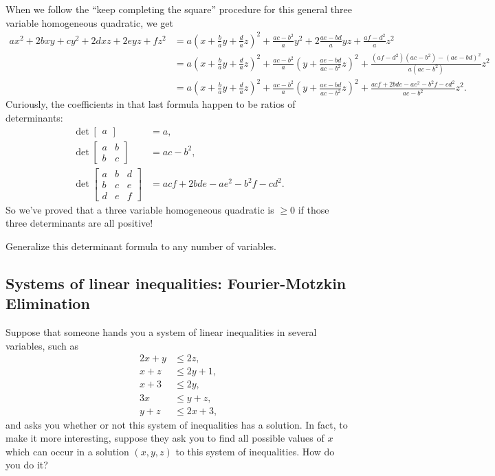 When we follow the ``keep completing the square'' procedure for this general three variable homogeneous quadratic, we get
\begin{align*}
ax^2 + 2bxy + cy^2 + 2dxz + 2eyz + fz^2 &= a(x + \tfrac{b}{a}y + \tfrac{d}{a}z)^2 + \tfrac{ac-b^2}{a}y^2 + 2\tfrac{ae-bd}{a}yz + \tfrac{af-d^2}{a}z^2\\
&= a(x + \tfrac{b}{a}y + \tfrac{d}{a}z)^2 + \tfrac{ac-b^2}{a}(y + \tfrac{ae-bd}{ac-b^2}z)^2 + \tfrac{(af-d^2)(ac-b^2)-(ae-bd)^2}{a(ac-b^2)}z^2\\
&= a(x + \tfrac{b}{a}y + \tfrac{d}{a}z)^2 + \tfrac{ac-b^2}{a}(y + \tfrac{ae-bd}{ac-b^2}z)^2 + \tfrac{acf + 2bde - ae^2 - b^2f - cd^2}{ac-b^2}z^2.
\end{align*}
Curiously, the coefficients in that last formula happen to be ratios of determinants:
\begin{align*}
\det \begin{bmatrix} a\end{bmatrix} &= a,\\
\det \begin{bmatrix} a & b\\ b & c\end{bmatrix} &= ac - b^2,\\
\det \begin{bmatrix} a & b & d\\ b & c & e\\ d & e & f \end{bmatrix} &= acf + 2bde - ae^2 - b^2f - cd^2.
\end{align*}
So we've proved that a three variable homogeneous quadratic is $\ge 0$ if those three determinants are all positive!

\bigskip

\begin{exer} Generalize this determinant formula to any number of variables.
\end{exer}


\subsection{Systems of linear inequalities: Fourier-Motzkin Elimination}

Suppose that someone hands you a system of linear inequalities in several variables, such as
\begin{align*}
2x + y &\le 2z,\\
x + z &\le 2y + 1,\\
x + 3 &\le 2y,\\
3x &\le y + z,\\
y + z &\le 2x + 3,
\end{align*}
and asks you whether or not this system of inequalities has a solution. In fact, to make it more interesting, suppose they ask you to find all possible values of $x$ which can occur in a solution $(x,y,z)$ to this system of inequalities. How do you do it?

